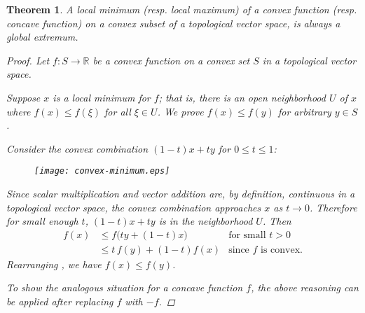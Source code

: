 \documentclass[12pt]{article}
\newtheorem{thm}{Theorem}
\begin{document}
\begin{thm}
A local minimum (resp. local maximum) of a convex function
(resp. concave function) on a
convex subset of a topological vector space, is always a global extremum.

\begin{proof}
Let $f:S\to \mathbb{R}$ be a convex function
on a convex set $S$ in a topological vector space.

Suppose $x$ is a local minimum for $f$;
that is, there is an open neighborhood $U$ of $x$
where $f(x) \leq f(\xi)$  for all $\xi\in U$.
We prove $f(x) \leq f(y)$ for arbitrary $y \in S$.

Consider the convex combination $(1-t)x + ty$ for $0 \leq t \leq 1$:
\begin{figure}[!htb]
\begin{center}
  \texttt{[image: convex-minimum.eps]}
\end{center}
\end{figure}
Since scalar multiplication and vector addition are, by definition,
continuous in a topological vector space, the convex combination approaches
$x$ as $t \to 0$.  Therefore for small enough $t$,
$(1-t)x + ty$ is in the neighborhood $U$.
Then
\begin{align*}
f(x) &\leq f\bigl(ty + (1-t) x\bigr)  & \text{for small $t > 0$} \\
&\leq t \, f(y) + (1-t) f(x) & \text{since $f$ is convex.}
\end{align*}
Rearranging , we have $f(x) \leq f(y)$.

To show the analogous situation for a concave function $f$,
the above reasoning can be applied after replacing $f$ with $-f$.
\end{proof}
\end{thm}

\end{document}
